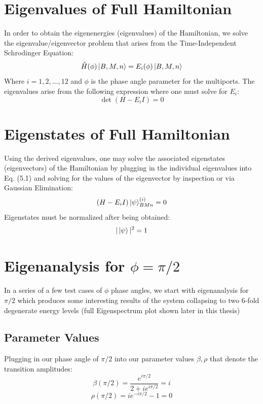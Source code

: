 \section{Eigenvalues of Full Hamiltonian}
In order to obtain the eigenenergies (eigenvalues) of the Hamiltonian, we solve the eigenvalue/eigenvector problem that arises from the Time-Independent Schrodinger Equation:
\begin{equation}
    \hat{H}(\phi)\ket{B,M,n} = E_{i}(\phi)\ket{B,M,n}
\end{equation}
Where $i = 1,2,\hdots ,12$ and $\phi$ is the phase angle parameter for the multiports. \newline
The eigenvalues arise from the following expression where one must solve for $E_{i}$:
\begin{equation}
    \det (H - E_{i}I) = 0
\end{equation}
\section{Eigenstates of Full Hamiltonian}
Using the derived eigenvalues, one may solve the associated eigenstates (eigenvectors) of the Hamiltonian by plugging in the individual eigenvalues into Eq. (5.1) and solving for the values of the eigenvector by inspection or via Gaussian Elimination:
\begin{equation}
    (H - E_{i}I)\ket{\psi}_{BMn}^{(i)} = 0 
\end{equation}
Eigenstates must be normalized after being obtained:
\begin{equation}
    |\ket{\psi}|^2 = 1
\end{equation}
\section{Eigenanalysis for $\phi = \pi/2$}
In a series of a few test cases of $\phi$ phase angles, we start with eigenanalysis for $\pi/2$ which produces some interesting results of the system collapsing to two 6-fold degenerate energy levels (full Eigenspectrum plot shown later in this thesis)
\subsection{Parameter Values}
Plugging in our phase angle of $\pi/2$ into our parameter values $\beta, \rho$ that denote the transition amplitudes:
\begin{equation}
    \beta(\pi/2) = \frac{e^{i\pi/2}}{2+ie^{i\pi/2}} = i 
\end{equation}
\begin{equation}
    \rho(\pi/2) = ie^{-i\pi/2} - 1 = 0
\end{equation}
